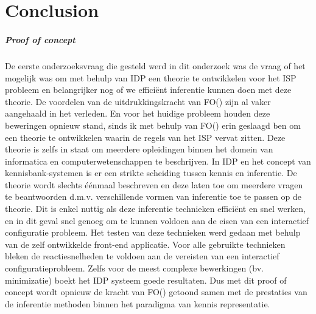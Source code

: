 \chapter{Conclusion}
\label{cha:conclusion}
\paragraph{Proof of concept}
De eerste onderzoeksvraag die gesteld werd in dit onderzoek was de vraag of het mogelijk was om met behulp van IDP een theorie te ontwikkelen voor het ISP probleem en belangrijker nog of we effici\"{e}nt inferentie kunnen doen met deze theorie. De voordelen van de uitdrukkingskracht van FO(\textperiodcentered) zijn al vaker aangehaald \cite{van2016kb} \cite{de2014predicate} in het verleden. En voor het huidige probleem houden deze beweringen opnieuw stand, sinds ik met behulp van FO(\textperiodcentered) erin geslaagd ben om een theorie te ontwikkelen waarin de regels van het ISP vervat zitten. Deze theorie is zelfs in staat om meerdere opleidingen binnen het domein van informatica en computerwetenschappen te beschrijven. 
In IDP en het concept van kennisbank-systemen is er een strikte scheiding tussen kennis en inferentie. De theorie wordt slechts \'{e}\'{e}nmaal beschreven en deze laten toe om meerdere vragen te beantwoorden d.m.v. verschillende vormen van inferentie toe te passen op de theorie. Dit is enkel nuttig als deze inferentie technieken effici\"{e}nt en snel werken, en in dit geval snel genoeg om te kunnen voldoen aan de eisen van een interactief configuratie probleem. Het testen van deze technieken werd gedaan met behulp van de zelf ontwikkelde front-end applicatie. Voor alle gebruikte technieken bleken de reactiesnelheden te voldoen aan de vereisten van een interactief configuratieprobleem. Zelfs voor de meest complexe bewerkingen (bv. minimizatie) boekt het IDP systeem goede resultaten. Dus met dit proof of concept wordt opnieuw de kracht van FO(\textperiodcentered) getoond samen met de prestaties van de inferentie methoden binnen het paradigma van kennis representatie.

